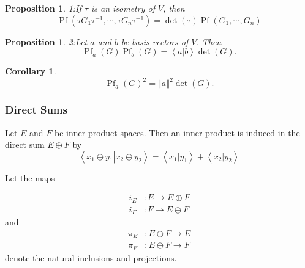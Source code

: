 \documentclass[aps,preprint]{revtex4}%
\newtheorem{corollary}[theorem]{Corollary}
\newtheorem{proposition}[theorem]{Proposition}
\begin{document}
\begin{proposition}
1:If $\mathfrak{\tau}$ is an isometry of $V$, then
\begin{equation}
\operatorname{Pf}\left(  \mathfrak{\tau}G_{1}\mathfrak{\tau}^{-1}%
,\cdots,\mathfrak{\tau}G_{n}\mathfrak{\tau}^{-1}\right)  =\det\left(
\mathfrak{\tau}\right)  \operatorname{Pf}\left(  G_{1},\cdots,G_{n}\right)
\end{equation}

\end{proposition}

\begin{proposition}
2:Let $a$ and $b$ be basis vectors of $V$. Then%
\begin{equation}
\operatorname{Pf}_{a}\left(  G\right)  \operatorname{Pf}_{b}\left(  G\right)
=\left\langle \left.  a\right\vert b\right\rangle \det\left(  G\right)  .
\end{equation}

\end{proposition}

\begin{corollary}%
\begin{equation}
\operatorname{Pf}_{a}\left(  G\right)  ^{2}=\left\Vert a\right\Vert ^{2}%
\det\left(  G\right)  .
\end{equation}

\end{corollary}

\subsubsection{Direct Sums}

Let $E$ and $F$ be inner product spaces. Then an inner product is induced in
the direct sum $E\oplus F$ by%
\begin{equation}
\left\langle \left.  x_{1}\oplus y_{1}\right\vert x_{2}\oplus y_{2}%
\right\rangle =\left\langle \left.  x_{1}\right\vert y_{1}\right\rangle
+\left\langle \left.  x_{2}\right\vert y_{2}\right\rangle
\end{equation}


Let the maps%

\begin{align}
i_{E}  &  :E\rightarrow E\oplus F\\
i_{F}  &  :F\rightarrow E\oplus F
\end{align}
and
\begin{align}
\pi_{E}  &  :E\oplus F\rightarrow E\\
\pi_{F}  &  :E\oplus F\rightarrow F
\end{align}
denote the natural inclusions and projections.
\end{document}
